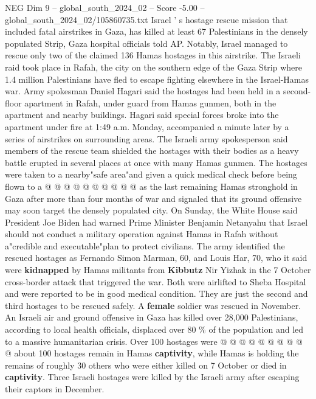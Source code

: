 \begin{textsample}{NEG Dim 9 – global\_south\_2024\_02 – Score -5.00 – global\_south\_2024\_02/105860735.txt}  \label{ex:f9_neg_344}
Israel ' s hostage rescue mission that included fatal airstrikes in Gaza, has killed at least 67 Palestinians in the densely populated Strip, Gaza hospital officials told AP.
Notably, Israel managed to rescue only two of the claimed 136 Hamas hostages in this airstrike.
The Israeli raid took place in Rafah, the city on the southern edge of the Gaza Strip where 1.4 million Palestinians have fled to escape fighting elsewhere in the Israel-Hamas war.
Army spokesman Daniel Hagari said the hostages had been held in a second-floor apartment in Rafah, under guard from Hamas gunmen, both in the apartment and nearby buildings.
Hagari said special forces broke into the apartment under fire at 1:49 a.m.
Monday, accompanied a minute later by a series of airstrikes on surrounding areas.
The Israeli army spokesperson said members of the rescue team shielded the hostages with their bodies as a heavy battle erupted in several places at once with many Hamas gunmen.
The hostages were taken to a nearby"safe area"and given a quick medical check before being flown to a @ @ @ @ @ @ @ @ @ @ as the last remaining Hamas stronghold in Gaza after more than four months of war and signaled that its ground offensive may soon target the densely populated city.
On Sunday, the White House said President Joe Biden had warned Prime Minister Benjamin Netanyahu that Israel should not conduct a military operation against Hamas in Rafah without a"credible and executable"plan to protect civilians.
The army identified the rescued hostages as Fernando Simon Marman, 60, and Louis Har, 70, who it said were \textbf{kidnapped} by Hamas militants from \textbf{Kibbutz} Nir Yizhak in the 7 October cross-border attack that triggered the war.
Both were airlifted to Sheba Hospital and were reported to be in good medical condition.
They are just the second and third hostages to be rescued safely.
A \textbf{female} soldier was rescued in November.
An Israeli air and ground offensive in Gaza has killed over 28,000 Palestinians, according to local health officials, displaced over 80 \% of the population and led to a massive humanitarian crisis.
Over 100 hostages were @ @ @ @ @ @ @ @ @ @ about 100 hostages remain in Hamas \textbf{captivity}, while Hamas is holding the remains of roughly 30 others who were either killed on 7 October or died in \textbf{captivity}.
Three Israeli hostages were killed by the Israeli army after escaping their captors in December.

\end{textsample}
